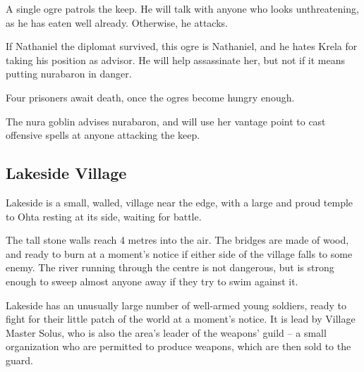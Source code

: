 \begin{multicols}{2}


A single ogre patrols the keep.
He will talk with anyone who looks unthreatening, as he has eaten well already.
Otherwise, he attacks.

If Nathaniel the diplomat survived, this ogre is Nathaniel, and he hates Krela for taking his position as advisor.
He will help assassinate her, but not if it means putting \gls{nurabaron} in danger.



Four prisoners await death, once the ogres become hungry enough.


The nura goblin advises \gls{nurabaron}, and will use her vantage point to cast offensive spells at anyone attacking the keep.



\subsection{Lakeside Village}
\label{lakeside}


Lakeside is a small, walled, village near the \gls{edge}, with a large and proud temple to Ohta resting at its side, waiting for battle.

The tall stone walls reach 4 metres into the air.
The bridges are made of wood, and ready to burn at a moment's notice if either side of the village falls to some enemy.
The river running through the centre is not dangerous, but is strong enough to sweep almost anyone away if they try to swim against it.

Lakeside has an unusually large number of well-armed young soldiers, ready to fight for their little patch of the world at a moment's notice.
It is lead by Village Master Solus, who is also the area's leader of the weapons' guild -- a small organization who are permitted to produce weapons, which are then sold to the \gls{guard}.


\end{multicols}

